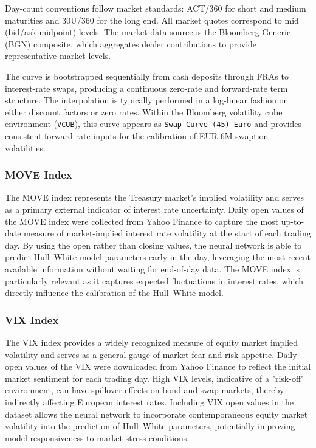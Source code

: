 Day-count conventions follow market standards: ACT/360 for short and medium maturities and 30U/360 for the long end. All market quotes correspond to mid (bid/ask midpoint) levels. The market data source is the Bloomberg Generic (BGN) composite, which aggregates dealer contributions to provide representative market levels.

The curve is bootstrapped sequentially from cash deposits through FRAs to interest-rate swaps, producing a continuous zero-rate and forward-rate term structure. The interpolation is typically performed in a log-linear fashion on either discount factors or zero rates. Within the Bloomberg volatility cube environment (\texttt{VCUB}), this curve appears as \texttt{Swap Curve (45) Euro} and provides consistent forward-rate inputs for the calibration of EUR 6M swaption volatilities.

\subsubsection{MOVE Index}
The MOVE index represents the Treasury market's implied volatility and serves as a primary external indicator of interest rate uncertainty. Daily open values of the MOVE index were collected from Yahoo Finance to capture the most up-to-date measure of market-implied interest rate volatility at the start of each trading day. By using the open rather than closing values, the neural network is able to predict Hull–White model parameters early in the day, leveraging the most recent available information without waiting for end-of-day data. The MOVE index is particularly relevant as it captures expected fluctuations in interest rates, which directly influence the calibration of the Hull–White model.

\subsubsection{VIX Index}
The VIX index provides a widely recognized measure of equity market implied volatility and serves as a general gauge of market fear and risk appetite. Daily open values of the VIX were downloaded from Yahoo Finance to reflect the initial market sentiment for each trading day. High VIX levels, indicative of a "risk-off" environment, can have spillover effects on bond and swap markets, thereby indirectly affecting European interest rates. Including VIX open values in the dataset allows the neural network to incorporate contemporaneous equity market volatility into the prediction of Hull–White parameters, potentially improving model responsiveness to market stress conditions.

